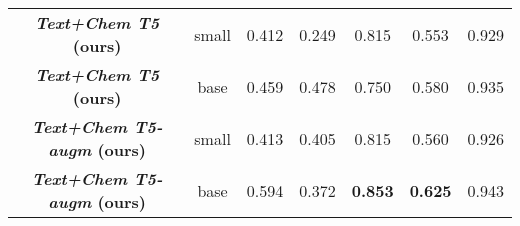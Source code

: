 \documentclass[nohyperref]{article}
\theoremstyle{plain}
\theoremstyle{definition}
\theoremstyle{remark}
\begin{document}
\begin{table*}[ht]
{\begin{tabular}{cc | ccccc}
    \midrule
    \textbf{\emph{Text+Chem T5}  (ours)}             & small & 0.412  & 0.249  & 0.815 & 0.553 & 0.929 \\
    \textbf{\emph{Text+Chem T5}  (ours)}              & base  & 0.459  & 0.478  & 0.750 & 0.580 & 0.935 \\
    \textbf{\emph{Text+Chem T5-augm} (ours)}             & small & 0.413  & 0.405  & 0.815 & 0.560 & 0.926 \\
    \textbf{\emph{Text+Chem T5-augm} (ours)}              & base  & 0.594  & 0.372  & \textbf{0.853} & \textbf{0.625} & 0.943 \\
    \bottomrule
    \end{tabular}
    }
    \label{tab:experiments-main}
\end{table*}

\begin{table*}[ht]
\small
    \centering
    \caption{\textbf{Results of the SMILES to Caption () task}. 
    The baselines include Transformer~\citep{edwards2022translation}, T5 (fine-tuned), and MolT5~\citep{edwards2022translation}. The metrics used in the table include BLEU-2, BLEU-4, Rouge-1, Rouge-2, Rouge-L, and Meteor, all of which are common metrics used to evaluate text generation models. The table shows that our proposed model, Text+Chem T5, outperforms the other baselines in all the metrics. Overall, \emph{Text+Chem T5}  is able to generate more accurate and informative captions for SMILES.
    }
    \label{tab:experiments-smiles-text}
\end{table*}
\end{document}
